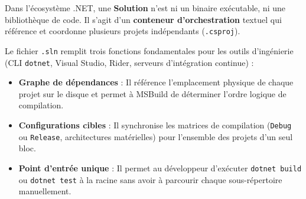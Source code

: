 \documentclass[a4paper,11pt]{report}
\begin{document}
\vspace{0.1cm}

Dans l'écosystème .NET, une \textbf{Solution} n'est ni un binaire exécutable, ni une bibliothèque de code. Il s'agit d'un \textbf{conteneur d'orchestration} textuel qui référence et coordonne plusieurs projets indépendants (\texttt{.csproj}).

Le fichier \texttt{.sln} remplit trois fonctions fondamentales pour les outils d'ingénierie (CLI \texttt{dotnet}, Visual Studio, Rider, serveurs d'intégration continue) :
\begin{itemize}
    \item \textbf{Graphe de dépendances} : Il référence l'emplacement physique de chaque projet sur le disque et permet à MSBuild de déterminer l'ordre logique de compilation.
    \item \textbf{Configurations cibles} : Il synchronise les matrices de compilation (\texttt{Debug} ou \texttt{Release}, architectures matérielles) pour l'ensemble des projets d'un seul bloc.
    \item \textbf{Point d'entrée unique} : Il permet au développeur d'exécuter \texttt{dotnet build} ou \texttt{dotnet test} à la racine sans avoir à parcourir chaque sous-répertoire manuellement.
\end{itemize}

\vspace{0.3cm}
\end{document}
